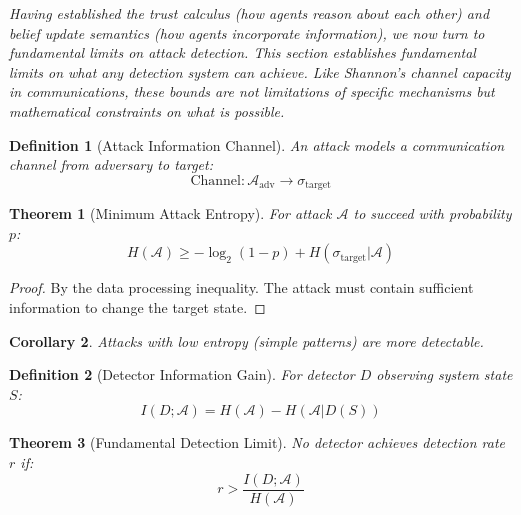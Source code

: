 \documentclass[
]{article}
\newtheorem{definition}{Definition}[section]
\newtheorem{theorem}{Theorem}[section]
\newtheorem{corollary}[theorem]{Corollary}
\begin{document}
\emph{Having established the trust calculus (how agents reason about
each other) and belief update semantics (how agents incorporate
information), we now turn to fundamental limits on attack detection.
This section establishes fundamental limits on what any detection system
can achieve. Like Shannon's channel capacity in communications, these
bounds are not limitations of specific mechanisms but mathematical
constraints on what is possible.}

\begin{definition}[Attack Information Channel]
\label{def:attack-channel}
An attack models a communication channel from adversary to target:
\begin{equation}
\label{eq:attack-channel}
\text{Channel}: \mathcal{A}_{\text{adv}} \to \sigma_{\text{target}}
\end{equation}
\end{definition}

\begin{theorem}[Minimum Attack Entropy]
\label{thm:min-entropy}
For attack $\mathcal{A}$ to succeed with probability $p$:
\begin{equation}
\label{eq:min-entropy}
H(\mathcal{A}) \geq -\log_2(1-p) + H(\sigma_{\text{target}}|\mathcal{A})
\end{equation}
\end{theorem}

\begin{proof}
By the data processing inequality. The attack must contain sufficient information to change the target state.
\end{proof}

\begin{corollary}
\label{cor:low-entropy-detectable}
Attacks with low entropy (simple patterns) are more detectable.
\end{corollary}

\begin{definition}[Detector Information Gain]
\label{def:detector-gain}
For detector $D$ observing system state $S$:
\begin{equation}
\label{eq:detector-gain}
I(D; \mathcal{A}) = H(\mathcal{A}) - H(\mathcal{A}|D(S))
\end{equation}
\end{definition}

\begin{theorem}[Fundamental Detection Limit]
\label{thm:detection-limit}
No detector achieves detection rate $r$ if:
\begin{equation}
\label{eq:detection-limit}
r > \frac{I(D; \mathcal{A})}{H(\mathcal{A})}
\end{equation}
\end{theorem}
\end{document}
